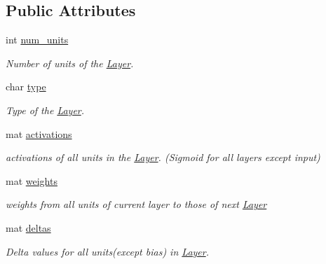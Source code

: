 \subsection*{Public Attributes}
\begin{DoxyCompactItemize}
\item 
\mbox{\label{classLayer_a2279fa161683004244a189093d7c09f4}} 
int \hyperlink{classLayer_a2279fa161683004244a189093d7c09f4}{num\+\_\+units}
\begin{DoxyCompactList}\small\item\em Number of units of the \hyperlink{classLayer}{Layer}. \end{DoxyCompactList}\item 
\mbox{\label{classLayer_a61ddf5cdb9881f7d6f170a5d2721e30d}} 
char \hyperlink{classLayer_a61ddf5cdb9881f7d6f170a5d2721e30d}{type}
\begin{DoxyCompactList}\small\item\em Type of the \hyperlink{classLayer}{Layer}. \end{DoxyCompactList}\item 
\mbox{\label{classLayer_a3d46008ff3feae925ae4479748e72b03}} 
mat \hyperlink{classLayer_a3d46008ff3feae925ae4479748e72b03}{activations}
\begin{DoxyCompactList}\small\item\em activations of all units in the \hyperlink{classLayer}{Layer}. (Sigmoid for all layers except input) \end{DoxyCompactList}\item 
\mbox{\label{classLayer_a59ad459ce8c31af94a391062c2caff90}} 
mat \hyperlink{classLayer_a59ad459ce8c31af94a391062c2caff90}{weights}
\begin{DoxyCompactList}\small\item\em weights from all units of current layer to those of next \hyperlink{classLayer}{Layer} \end{DoxyCompactList}\item 
\mbox{\label{classLayer_a51663bdfcd8b89bb8e368af005105db2}} 
mat \hyperlink{classLayer_a51663bdfcd8b89bb8e368af005105db2}{deltas}
\begin{DoxyCompactList}\small\item\em Delta values for all units(except bias) in \hyperlink{classLayer}{Layer}. \end{DoxyCompactList}\end{DoxyCompactItemize}



